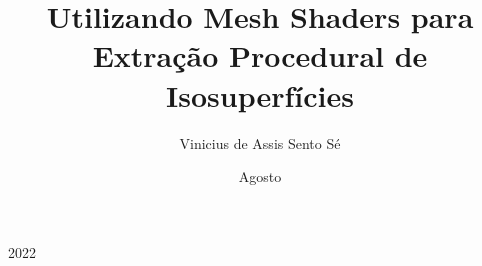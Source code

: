 \documentclass{projetofinal-dcc}
\begin{document}
\title{Utilizando Mesh Shaders para Extração Procedural de Isosuperfícies}

\author{Vinicius de Assis Sento Sé}{}





\date{Agosto}{2022}
\maketitle

\startdocument
\makethankspage

\begin{abstract}{
  
}
\end{abstract}

\begin{englishabstract}{
  
}
\end{englishabstract}

\makefigurespage
\end{document}
